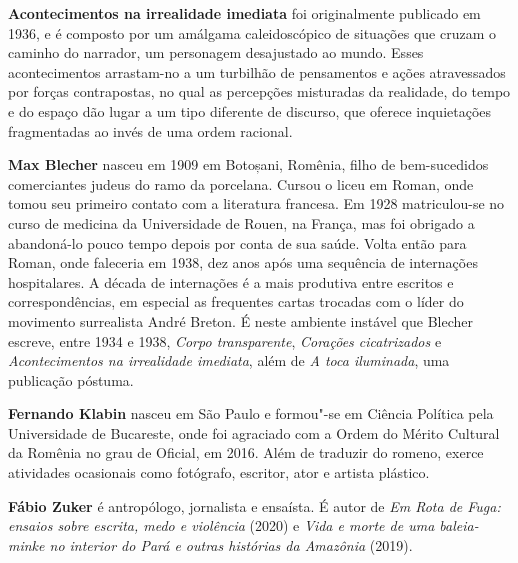 \textbf{Acontecimentos na irrealidade imediata} foi originalmente publicado em 1936, e é composto por um amálgama caleidoscópico de situações que cruzam o caminho do narrador, um personagem desajustado ao mundo. Esses acontecimentos arrastam-no a um turbilhão de pensamentos e ações atravessados por forças contrapostas, no qual as percepções misturadas da realidade, do tempo e do espaço dão lugar a um tipo diferente de discurso, que oferece inquietações fragmentadas ao invés de uma ordem racional.

\textbf{Max Blecher} nasceu em 1909 em Botoșani, Romênia, filho de bem-sucedidos comerciantes judeus do ramo da porcelana. Cursou o liceu em Roman, onde tomou seu primeiro contato com a literatura francesa. Em 1928 matriculou-se no curso de medicina da Universidade de Rouen, na França, mas foi obrigado a abandoná-lo pouco tempo depois por conta de sua saúde. Volta então para Roman, onde faleceria em 1938, dez anos após uma sequência de internações hospitalares. A década de internações é a mais produtiva entre escritos e correspondências, em especial as frequentes cartas trocadas com o líder do movimento surrealista André Breton. É neste ambiente instável que Blecher escreve, entre 1934 e 1938, \textit{Corpo transparente}, \textit{Corações cicatrizados} e \textit{Acontecimentos na irrealidade imediata}, além de \textit{A toca iluminada}, uma publicação póstuma.

\textbf{Fernando Klabin} nasceu em São Paulo e formou"-se em Ciência Política pela Universidade de Bucareste, onde foi agraciado com a Ordem do Mérito Cultural da Romênia no grau de Oficial, em 2016. Além de traduzir do romeno, exerce atividades ocasionais como fotógrafo, escritor, ator e artista plástico.

\textbf{Fábio Zuker} é antropólogo, jornalista e ensaísta. É autor de \textit{Em Rota de Fuga: ensaios sobre escrita, medo e violência} (2020) e \textit{Vida e morte de uma baleia-minke no interior do Pará e outras histórias da Amazônia} (2019).

